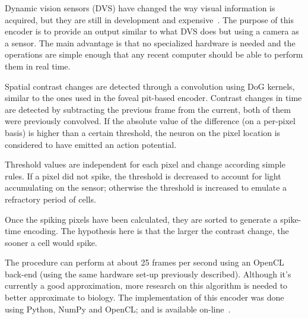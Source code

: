 Dynamic vision sensors (DVS) have changed the way visual information is acquired, but they are still in development and expensive~\cite{aer-retina-bernabe,dvs-zurich}. The purpose of this encoder is to provide an output similar to what DVS does but using a camera as a sensor.
The main advantage is that no specialized hardware is needed and the operations are simple enough that any recent computer should be able to perform them in real time. 

Spatial contrast changes are detected through a convolution using DoG kernels, similar to the ones used in the foveal pit-based encoder. Contrast changes in time are detected by subtracting the previous frame from the current, both of them were previously convolved. If the absolute value of the difference (on a per-pixel basis) is higher than a certain threshold, the neuron on the pixel location is considered to have emitted an action potential. 

Threshold values are independent for each pixel and change according simple rules. If a pixel did not spike, the threshold is decreased to account for light accumulating on the sensor; otherwise the threshold is increased to emulate a refractory period of cells.

Once the spiking pixels have been calculated, they are sorted to generate a spike-time encoding. The hypothesis here is that the larger the contrast change, the sooner a cell would spike. 

The procedure can perform at about 25 frames per second using an OpenCL back-end (using the same hardware set-up previously described). Although 
it's currently a good approximation, more research on this algorithm is needed 
to better approximate to biology. The implementation of this encoder was done using Python, NumPy and OpenCL; and is available on-line~\cite{pydvs-code}.

